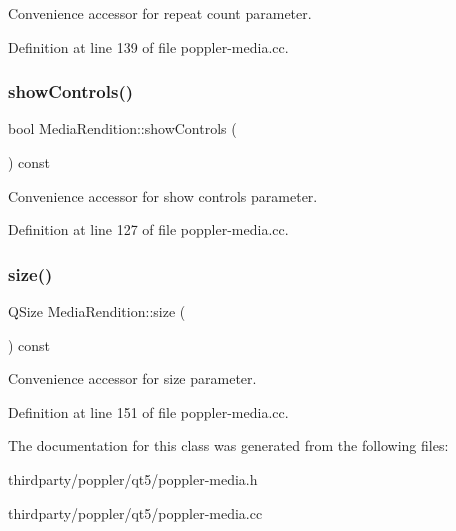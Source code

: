 Convenience accessor for repeat count parameter. 

Definition at line 139 of file poppler-\/media.\+cc.

\mbox{\label{class_poppler_1_1_media_rendition_a734c35bdd120909ffc307e3086b574d6}} 
\subsubsection{\texorpdfstring{show\+Controls()}{showControls()}}
{\footnotesize\ttfamily bool Media\+Rendition\+::show\+Controls (\begin{DoxyParamCaption}{ }\end{DoxyParamCaption}) const}

Convenience accessor for show controls parameter. 

Definition at line 127 of file poppler-\/media.\+cc.

\mbox{\label{class_poppler_1_1_media_rendition_ae54aff9bb07fae051ff19befd7854cdb}} 
\subsubsection{\texorpdfstring{size()}{size()}}
{\footnotesize\ttfamily Q\+Size Media\+Rendition\+::size (\begin{DoxyParamCaption}{ }\end{DoxyParamCaption}) const}

Convenience accessor for size parameter. 

Definition at line 151 of file poppler-\/media.\+cc.



The documentation for this class was generated from the following files\+:\begin{DoxyCompactItemize}
\item 
thirdparty/poppler/qt5/poppler-\/media.\+h\item 
thirdparty/poppler/qt5/poppler-\/media.\+cc\end{DoxyCompactItemize}
